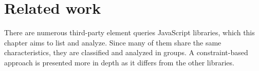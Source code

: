 \documentclass[a4paper,11pt]{kth-mag}
\begin{document}

  \chapter{Related work}\label{ch:related-work}
    There are numerous \gls{third-party} element queries \gls{JavaScript} libraries, which this chapter aims to list and analyze.
    Since many of them share the same characteristics, they are classified and analyzed in groups.
    A constraint-based approach is presented more in depth as it differs from the other libraries.
\end{document}
